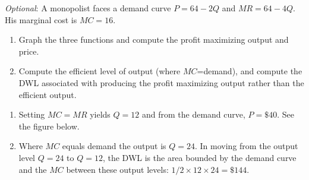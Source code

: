 \begin{enumialphparenastyle}
\begin{econex}\label{ex:ch10ex8}
\textit{Optional}: A monopolist faces a demand curve $P=64-2Q$ and $MR=64-4Q$. His marginal cost is $MC=16$.
\begin{enumerate}
\item	Graph the three functions and compute the profit maximizing output and price.
\item	Compute the efficient level of output (where $MC$=demand), and compute the DWL associated with producing the profit maximizing output rather than the efficient output.
\end{enumerate}
\begin{econsolution}
\begin{enumerate}
\item	Setting $MC=MR$ yields $Q=12$ and from the demand curve, $P=\$40$. See the figure below.
\item	Where $MC$ equals demand the output is $Q=24$. In moving from the output level $Q=24$ to $Q=12$, the DWL is the area bounded by the demand curve and the $MC$ between these output levels: $1/2\times 12\times 24=\$144$.
\end{enumerate}
\begin{center}
\end{center}
\end{econsolution}
\end{econex}

\end{enumialphparenastyle}
